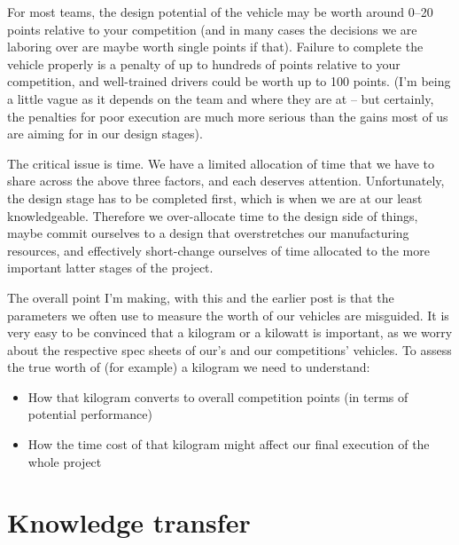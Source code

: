 \documentclass[10pt, a4paper, article, oneside, twocolumn, final]{memoir}
\begin{document}
For most teams, the design potential of the vehicle may be worth around \numrange{0}{20} points relative to your competition (and in many cases the decisions we are laboring over are maybe worth single points if that). Failure to complete the vehicle properly is a penalty of up to hundreds of points relative to your competition, and well-trained drivers could be worth up to \num{100} points. (I’m being a little vague as it depends on the team and where they are at -- but certainly, the penalties for poor execution are much more serious than the gains most of us are aiming for in our design stages). 

The critical issue is time. We have a limited allocation of time that we have to share across the above three factors, and each deserves attention. Unfortunately, the design stage has to be completed first, which is when we are at our least knowledgeable. Therefore we over-allocate time to the design side of things, maybe commit ourselves to a design that overstretches our manufacturing resources, and effectively short-change ourselves of time allocated to the more important latter stages of the project. 

The overall point I’m making, with this and the earlier post is that the parameters we often use to measure the worth of our vehicles are misguided. It is very easy to be convinced that a kilogram or a kilowatt is important, as we worry about the respective spec sheets of our’s and our competitions’ vehicles. To assess the true worth of (for example) a kilogram we need to understand: 

\begin{itemize}
    \item How that kilogram converts to overall competition points (in terms of potential performance) 
    \item How the time cost of that kilogram might affect our final execution of the whole project 
\end{itemize}



\chapter*{Knowledge transfer}
\end{document}
